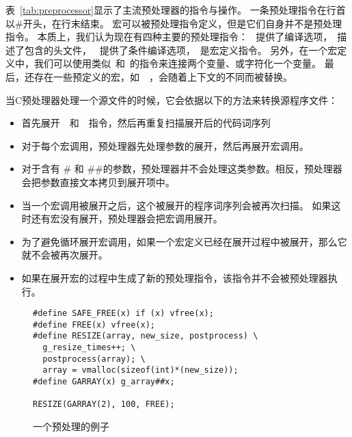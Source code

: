 表~\ref{tab:preprocessor}显示了主流预处理器的指令与操作。
一条预处理指令在行首以\#开头，在行末结束。
宏可以被预处理指令定义，但是它们自身并不是预处理指令。
本质上，我们认为现在有四种主要的预处理指令：
~提供了编译选项，~描述了包含的头文件，
~提供了条件编译选项，~是宏定义指令。
另外，在一个宏定义中，我们可以使用类似\code{\#\#}~和\code{\#}~的指令来连接两个变量、或字符化一个变量。
最后，还存在一些预定义的宏，如~~，会随着上下文的不同而被替换。

当C预处理器处理一个源文件的时候，它会依据以下的方法来转换源程序文件：
\begin{itemize}
\item 首先展开~~和~~指令，然后再重复扫描展开后的代码词序列
\item 对于每个宏调用，预处理器先处理参数的展开，然后再展开宏调用。
\item 对于含有 \# 和 \#\#的参数，预处理器并不会处理这类参数。相反，预处理器会把参数直接文本拷贝到展开项中。
\item 当一个宏调用被展开之后，这个被展开的程序词序列会被再次扫描。
      如果这时还有宏没有展开，预处理器会把宏调用展开。
\item 为了避免循环展开宏调用，如果一个宏定义已经在展开过程中被展开，那么它就不会被再次展开。
\item 如果在展开宏的过程中生成了新的预处理指令，该指令并不会被预处理器执行。
\end{itemize}

\begin{figure}[ht]
  \centering
\begin{lstlisting}
#define SAFE_FREE(x) if (x) vfree(x);
#define FREE(x) vfree(x);
#define RESIZE(array, new_size, postprocess) \
  g_resize_times++; \
  postprocess(array); \
  array = vmalloc(sizeof(int)*(new_size));
#define GARRAY(x) g_array##x;

RESIZE(GARRAY(2), 100, FREE);
\end{lstlisting}
  \caption{一个预处理的例子\label{fig:example} }
\end{figure}

